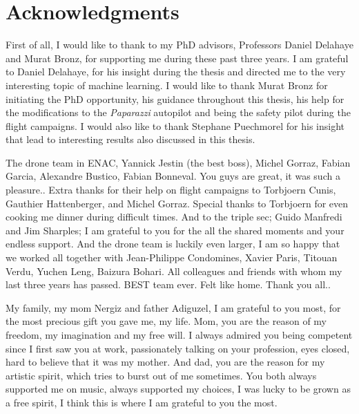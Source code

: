 % 

\cleardoublepage

\section*{Acknowledgments}


First of all, I would like to thank to my PhD advisors, Professors Daniel Delahaye and Murat Bronz, for supporting me during these past three years. I am grateful to Daniel Delahaye, for his insight during the thesis and directed me to the very interesting topic of machine learning. I would like to thank Murat Bronz for initiating the PhD opportunity, his guidance throughout this thesis, his help for the modifications to the \emph{Paparazzi} autopilot and being the safety pilot during the flight campaigns. I would also like to thank  Stephane Puechmorel for his insight that lead to interesting results also discussed in this thesis.

The drone team in ENAC, Yannick Jestin (the best boss), Michel Gorraz, Fabian Garcia, Alexandre Bustico, Fabian Bonneval. You guys are great, it was such a pleasure..
Extra thanks for their help on flight campaigns to Torbjoern Cunis, Gauthier Hattenberger, and Michel Gorraz.
Special thanks to Torbjoern for even cooking me dinner during difficult times. 
And to the triple sec; Guido Manfredi and Jim Sharples; I am grateful to you for the all the shared moments and your endless support.
And the drone team is luckily even larger, I am so happy that we worked all together with Jean-Philippe Condomines, Xavier Paris, Titouan Verdu, Yuchen Leng, Baizura Bohari.
All colleagues and friends with whom my last three years has passed. BEST team ever. Felt like home. Thank you all..

My family, my mom Nergiz and father Adiguzel, I am grateful to you most, for the most precious gift you gave me, my life. 
Mom, you are the reason of my freedom, my imagination and my free will. I always admired you being competent since I first saw you at work, passionately talking on your profession, eyes closed, hard to believe that it was my mother. 
And dad, you are the reason for my artistic spirit, which tries to burst out of me sometimes. You both always supported me on music, always supported my choices, I was lucky to be grown as a free spirit, I think this is where I am grateful to you the most. 


